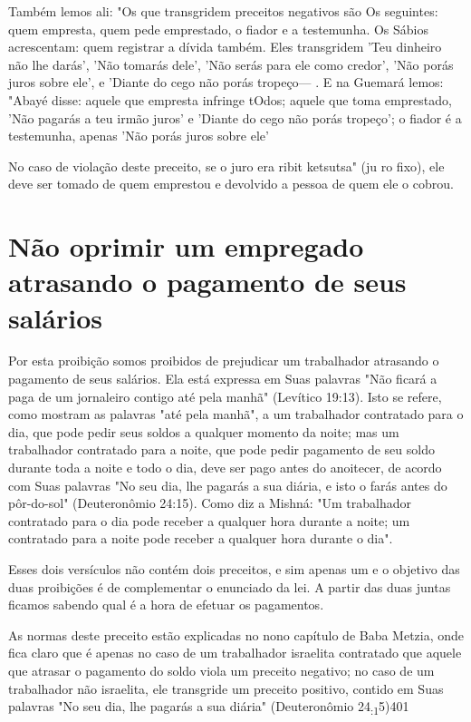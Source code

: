 Também lemos ali: "Os que transgridem preceitos negativos são Os
seguintes: quem empresta, quem pede emprestado, o fiador e a testemunha.
Os Sábios acrescentam: quem registrar a dívida também. Eles transgridem
'Teu dinheiro não lhe darás', 'Não tomarás dele', 'Não serás para ele
como credor', 'Não porás juros sobre ele', e 'Diante do cego não porás
tropeço--- . E na Gue­mará lemos: "Abayé disse: aquele
que empresta infringe tOdos; aquele que to­ma emprestado, 'Não pagarás a
teu irmão juros' e 'Diante do cego não porás tropeço'; o fiador é a
testemunha, apenas 'Não porás juros sobre ele'

No caso de violação deste preceito, se o juro era ribit ketsutsa" (ju ro
fixo), ele deve ser tomado de quem emprestou e devolvido a pessoa de
quem ele o cobrou.


\section{Não oprimir um empregado atrasando o pagamento de seus salários}

Por esta proibição somos proibidos de prejudicar um trabalhador
atra­sando o pagamento de seus salários. Ela está expressa em Suas
palavras "Não ficará a paga de um jornaleiro contigo até pela manhã"
(Levítico 19:13). Isto se refere, como mostram as palavras "até pela
manhã", a um trabalhador con­tratado para o dia, que pode pedir seus
soldos a qualquer momento da noite; mas um trabalhador contratado para a
noite, que pode pedir pagamento de seu soldo durante toda a noite e todo
o dia, deve ser pago antes do anoitecer, de acordo com Suas palavras "No
seu dia, lhe pagarás a sua diária, e isto o farás antes do pôr-do-sol"
(Deuteronômio 24:15). Como diz a Mishná: "Um traba­lhador contratado
para o dia pode receber a qualquer hora durante a noite; um contratado
para a noite pode receber a qualquer hora durante o dia".

Esses dois versículos não contém dois preceitos, e sim apenas um e o
objetivo das duas proibições é de complementar o enunciado da lei. A
par­tir das duas juntas ficamos sabendo qual é a hora de efetuar os
pagamentos.

As normas deste preceito estão explicadas no nono capítulo de Baba
Metzia, onde fica claro que é apenas no caso de um trabalhador israelita
contra­tado que aquele que atrasar o pagamento do soldo viola um
preceito negativo; no caso de um trabalhador não israelita, ele
transgride um preceito positivo, contido em Suas palavras "No seu dia,
lhe pagarás a sua diária" (Deuteronômio 24\textsubscript{:1}5)401

